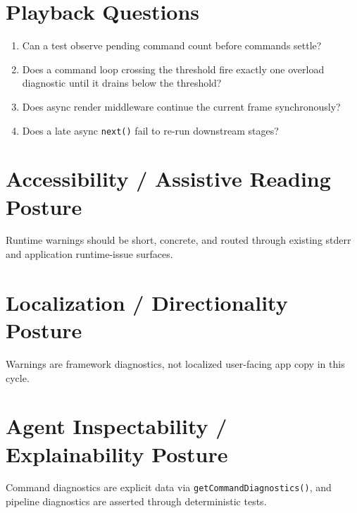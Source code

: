 \section{Playback Questions}\label{record-166-playback-questions}

\begin{enumerate}
\def\labelenumi{\arabic{enumi}.}
\tightlist
\item
  Can a test observe pending command count before commands settle?
\item
  Does a command loop crossing the threshold fire exactly one overload diagnostic until it drains below the threshold?
\item
  Does async render middleware continue the current frame synchronously?
\item
  Does a late async \texttt{n\allowbreak{}e\allowbreak{}x\allowbreak{}t\allowbreak{}(\allowbreak{})} fail to re-run downstream stages?
\end{enumerate}

\section{Accessibility / Assistive Reading Posture}\label{record-166-accessibility-assistive-reading-posture}

Runtime warnings should be short, concrete, and routed through existing stderr and application runtime-issue surfaces.

\section{Localization / Directionality Posture}\label{record-166-localization-directionality-posture}

Warnings are framework diagnostics, not localized user-facing app copy in this cycle.

\section{Agent Inspectability / Explainability Posture}\label{record-166-agent-inspectability-explainability-posture}

Command diagnostics are explicit data via \texttt{g\allowbreak{}e\allowbreak{}t\allowbreak{}C\allowbreak{}o\allowbreak{}m\allowbreak{}m\allowbreak{}a\allowbreak{}n\allowbreak{}d\allowbreak{}D\allowbreak{}i\allowbreak{}a\allowbreak{}g\allowbreak{}n\allowbreak{}o\allowbreak{}s\allowbreak{}t\allowbreak{}i\allowbreak{}c\allowbreak{}s\allowbreak{}(\allowbreak{})}, and pipeline diagnostics are asserted through deterministic tests.

